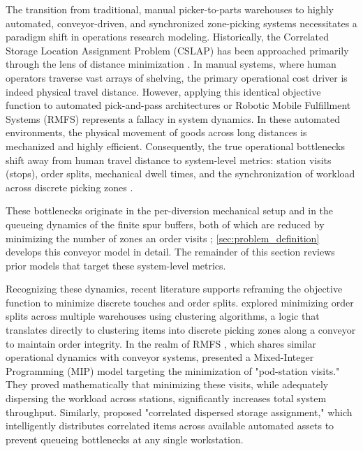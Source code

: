 \documentclass[preprint,review,11pt,authoryear]{elsarticle}
\begin{document}
The transition from traditional, manual picker-to-parts warehouses to highly automated, conveyor-driven, and synchronized zone-picking systems necessitates a paradigm shift in operations research modeling. Historically, the Correlated Storage Location Assignment Problem (CSLAP) has been approached primarily through the lens of distance minimization \cite{islam2023, xiao2010correlated}. In manual systems, where human operators traverse vast arrays of shelving, the primary operational cost driver is indeed physical travel distance. However, applying this identical objective function to automated pick-and-pass architectures or Robotic Mobile Fulfillment Systems (RMFS) \cite{azadeh2019} represents a fallacy in system dynamics. In these automated environments, the physical movement of goods across long distances is mechanized and highly efficient. Consequently, the true operational bottlenecks shift away from human travel distance to system-level metrics: station visits (stops), order splits, mechanical dwell times, and the synchronization of workload across discrete picking zones \cite{xie2021}.

These bottlenecks originate in the per-diversion mechanical setup and in the queueing dynamics of the finite spur buffers, both of which are reduced by minimizing the number of zones an order visits \cite{zhu2021, kim2020}; \cref{sec:problem_definition} develops this conveyor model in detail. The remainder of this section reviews prior models that target these system-level metrics.

Recognizing these dynamics, recent literature supports reframing the objective function to minimize discrete touches and order splits. \citet{zhu2021} explored minimizing order splits across multiple warehouses using clustering algorithms, a logic that translates directly to clustering items into discrete picking zones along a conveyor to maintain order integrity. In the realm of RMFS \cite{azadeh2019}, which shares similar operational dynamics with conveyor systems, \citet{xie2021} presented a Mixed-Integer Programming (MIP) model targeting the minimization of "pod-station visits." They proved mathematically that minimizing these visits, while adequately dispersing the workload across stations, significantly increases total system throughput. Similarly, \citet{mirzaei2021} proposed "correlated dispersed storage assignment," which intelligently distributes correlated items across available automated assets to prevent queueing bottlenecks at any single workstation.
\end{document}

